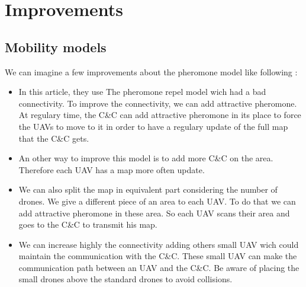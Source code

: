 \chapter{Improvements}

\section{Mobility models}

We can imagine a few improvements about the pheromone model like following :

\begin{itemize}

\item In this article, they use The pheromone repel model wich had a bad connectivity. To improve the connectivity, we can add attractive pheromone. At regulary time, the C\&C can add attractive pheromone in its place to force the UAVs to move to it in order to have a regulary update of the full map that the C\&C gets.

\item An other way to improve this model is to add more C\&C on the area. Therefore each UAV has a map more often update.

\item We can also split the map in equivalent part considering the number of drones. We give a different piece of an area to each UAV. To do that we can add attractive pheromone in these area. So each UAV scans their area and goes to the C\&C to transmit his map.

\item We can increase highly the connectivity adding others small UAV wich could maintain the communication with the C\&C. These small UAV can make the communication path between an UAV and the C\&C. Be aware of placing the small drones above the standard drones to avoid collisions.

\end{itemize}



